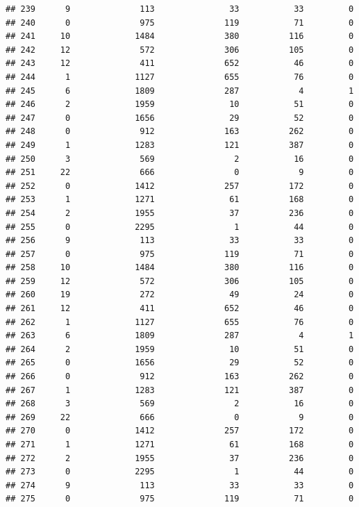 \documentclass[
]{article}
\begin{document}
\begin{verbatim}
## 239      9              113               33           33         0
## 240      0              975              119           71         0
## 241     10             1484              380          116         0
## 242     12              572              306          105         0
## 243     12              411              652           46         0
## 244      1             1127              655           76         0
## 245      6             1809              287            4         1
## 246      2             1959               10           51         0
## 247      0             1656               29           52         0
## 248      0              912              163          262         0
## 249      1             1283              121          387         0
## 250      3              569                2           16         0
## 251     22              666                0            9         0
## 252      0             1412              257          172         0
## 253      1             1271               61          168         0
## 254      2             1955               37          236         0
## 255      0             2295                1           44         0
## 256      9              113               33           33         0
## 257      0              975              119           71         0
## 258     10             1484              380          116         0
## 259     12              572              306          105         0
## 260     19              272               49           24         0
## 261     12              411              652           46         0
## 262      1             1127              655           76         0
## 263      6             1809              287            4         1
## 264      2             1959               10           51         0
## 265      0             1656               29           52         0
## 266      0              912              163          262         0
## 267      1             1283              121          387         0
## 268      3              569                2           16         0
## 269     22              666                0            9         0
## 270      0             1412              257          172         0
## 271      1             1271               61          168         0
## 272      2             1955               37          236         0
## 273      0             2295                1           44         0
## 274      9              113               33           33         0
## 275      0              975              119           71         0

\end{verbatim}
\end{document}
